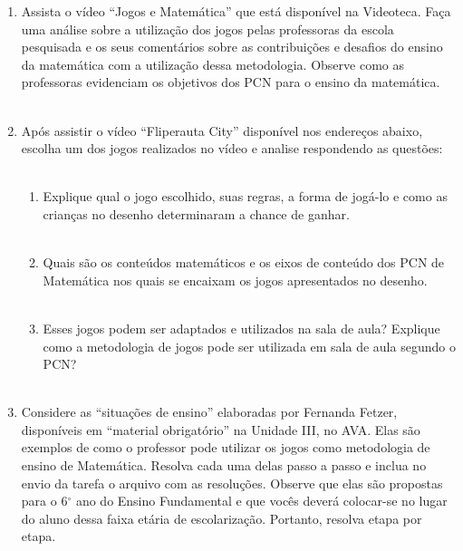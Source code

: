 \documentclass[a4paper, 12pt]{article}
\begin{document}
\begin{enumerate}
\item Assista o vídeo ``Jogos e Matemática'' que está disponível na Videoteca. Faça uma análise sobre a utilização dos jogos pelas professoras da escola pesquisada e os seus comentários sobre as contribuições e desafios do ensino da matemática com a utilização dessa metodologia. Observe como as professoras evidenciam os objetivos dos PCN para o ensino da matemática. \\ \\
\item Após assistir o vídeo ``Fliperauta City'' disponível nos endereços abaixo, escolha um dos jogos realizados no vídeo e analise respondendo as questões: \\ \\
  \begin{enumerate}
  \item Explique qual o jogo escolhido, suas regras, a forma de jogá-lo e como as crianças no desenho determinaram a chance de ganhar. \\ \\
  \item Quais são os conteúdos matemáticos e os eixos de conteúdo dos PCN de Matemática nos quais se encaixam os jogos apresentados no desenho. \\ \\
  \item Esses jogos podem ser adaptados e utilizados na sala de aula? Explique como a metodologia de jogos pode ser utilizada em sala de aula segundo o PCN? \\ \\
  \end{enumerate}
\item Considere as ``situações de ensino'' elaboradas por Fernanda Fetzer, disponíveis em ``material obrigatório'' na Unidade III, no AVA. Elas são exemplos de como o professor pode utilizar os jogos como metodologia de ensino de Matemática. Resolva cada uma delas passo a passo e inclua no envio da tarefa o arquivo com as resoluções. Observe que elas são propostas para o 6$^{\circ}$ ano do Ensino Fundamental e que vocês deverá colocar-se no lugar do aluno dessa faixa etária de escolarização. Portanto, resolva etapa por etapa.
\end{enumerate}
\end{document}
